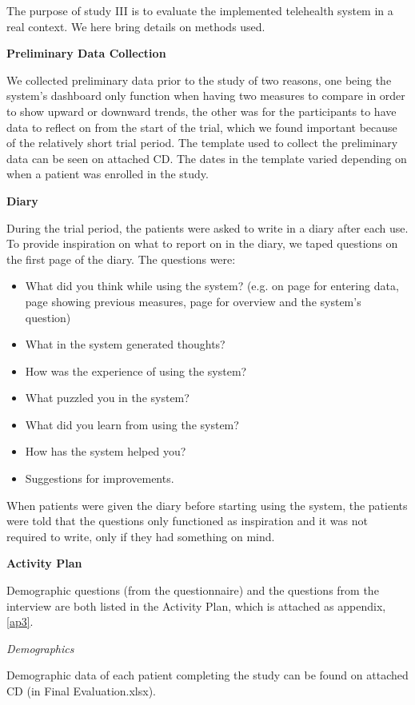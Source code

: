 The purpose of study III is to evaluate the implemented telehealth system in a real context. We here bring details on methods used.

\textbf{Preliminary Data Collection}

We collected preliminary data prior to the study of two reasons, one being the system's dashboard only function when having two measures to compare in order to show upward or downward trends, the other was for the participants to have data to reflect on from the start of the trial, which we found important because of the relatively short trial period. The template used to collect the preliminary data can be seen on attached CD. The dates in the template varied depending on when a patient was enrolled in the study.

\textbf{Diary}

During the trial period, the patients were asked to write in a diary after each use. To provide inspiration on what to report on in the diary, we taped questions on the first page of the diary. The questions were:
\begin{itemize}
	\item What did you think while using the system? (e.g. on page for entering data, page showing previous measures, page for overview and the system's question)
	\item What in the system generated thoughts?
	\item How was the experience of using the system?
	\item What puzzled you in the system?
	\item What did you learn from using the system?
	\item How has the system helped you?
	\item Suggestions for improvements.
\end{itemize}
When patients were given the diary before starting using the system, the patients were told that the questions only functioned as inspiration and it was not required to write, only if they had something on mind.

\textbf{Activity Plan}

Demographic questions (from the questionnaire) and the questions from the interview are both listed in the Activity Plan, which is attached as appendix, \ref{ap3}.

\textit{Demographics}

Demographic data of each patient completing the study can be found on attached CD (in Final Evaluation.xlsx).

